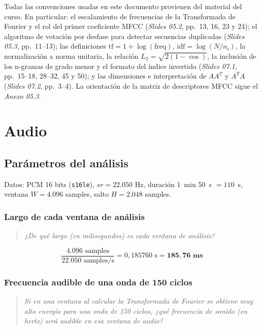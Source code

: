 \documentclass[11pt, a4paper]{article}
\newcommand{\code}[1]{\texttt{#1}}
\newenvironment{enunciado}
  {\begin{quote}\itshape\color{black!75}\small}
  {\end{quote}}
\begin{document}
Todas las convenciones usadas en este documento provienen del material del curso. En particular:
el escalamiento de frecuencias de la Transformada de Fourier y el rol del primer coeficiente MFCC
(\textit{Slides 05.2}, pp.~13, 16, 23 y 24); el algoritmo de votación por desfase para detectar
secuencias duplicadas (\textit{Slides 05.3}, pp.~11--13); las definiciones
$\mathrm{tf} = 1 + \log(\mathrm{freq})$, $\mathrm{idf} = \log(N/n_i)$, la normalización a norma
unitaria, la relación $L_2 = \sqrt{2(1-\cos)}$, la inclusión de los n-gramas de grado menor y el
formato del índice invertido (\textit{Slides 07.1}, pp.~15--18, 28--32, 45 y 50); y las dimensiones e
interpretación de $AA^T$ y $A^TA$ (\textit{Slides 07.2}, pp.~3--4). La orientación de la matriz de
descriptores MFCC sigue el \textit{Anexo 05.3}.

\section{Audio}

\subsection{Parámetros del análisis}

Datos: PCM 16 bits (\code{s16le}), $sr = 22.050$ Hz, duración 1~min 50~s $= 110$~s, ventana
$W = 4.096$ samples, salto $H = 2.048$ samples.

\subsubsection{Largo de cada ventana de análisis}

\begin{enunciado}
¿De qué largo (en milisegundos) es cada ventana de análisis?
\end{enunciado}

\begin{equation}
\frac{4.096 \text{ samples}}{22.050 \text{ samples/s}} = 0{,}185760 \text{ s}
= \mathbf{185{,}76 \text{ ms}}
\end{equation}

\subsubsection{Frecuencia audible de una onda de 150 ciclos}

\begin{enunciado}
Si en una ventana al calcular la Transformada de Fourier se obtiene muy alta energía para una onda
de 150 ciclos, ¿qué frecuencia de sonido (en hertz) será audible en esa ventana de audio?
\end{enunciado}
\end{document}
